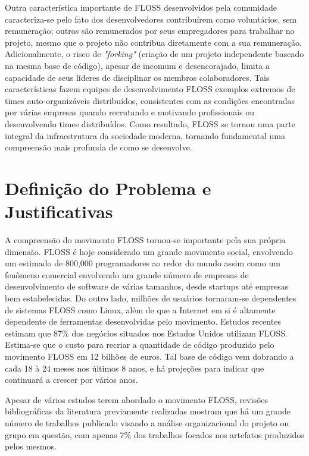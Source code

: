 Outra característica importante de FLOSS desenvolvidos pela comunidade caracteriza-se pelo fato dos desenvolvedores contribuírem como voluntários, sem remuneração; outros são remunerados por seus empregadores para trabalhar no projeto, mesmo que o projeto não contribua diretamente com a sua remuneração. Adicionalmente, o risco de \textit{"forking"} (criação de um projeto independente baseado na mesma base de código), apesar de incomum e desencorajado, limita a capacidade de seus líderes de disciplinar os membros colaboradores. Tais características fazem equipes de desenvolvimento FLOSS exemplos extremos de times auto-organizáveis distribuídos, consistentes com as condições encontradas por várias empresas quando recrutando e motivando profissionais ou desenvolvendo times distribuídos.
Como resultado, FLOSS se tornou uma parte integral da infraestrutura da sociedade moderna, tornando fundamental uma compreensão mais profunda de como se desenvolve.




\section{Definição do Problema e Justificativas}

A compreensão do movimento FLOSS tornou-se importante pela sua própria dimensão\cite{crowston2012free}. FLOSS é hoje considerado um grande movimento social, envolvendo um estimado de 800,000 programadores ao redor do mundo assim como um fenômeno comercial envolvendo um grande número de empresas de desenvolvimento de software de várias tamanhos, desde startups até empresas bem estabelecidas. Do outro lado, milhões  de usuários tornaram-se dependentes de sistemas FLOSS como Linux, além de que a Internet em si é altamente dependente de ferramentas desenvolvidas pelo movimento. Estudos recentes estimam que 87\% dos negócios situados nos Estados Unidos utilizam FLOSS. Estima-se que o custo para recriar a quantidade de código produzido pelo movimento FLOSS em 12 bilhões de euros. Tal base de código vem dobrando a cada 18 à 24 meses nos últimos 8 anos, e há projeções para indicar que continuará a crescer por vários anos\cite{ghosh2007economic}. 

Apesar de vários estudos terem abordado o movimento FLOSS, revisões bibliográficas da literatura previamente realizadas\cite{crowston2012free} mostram que 
há um grande número de trabalhos publicado visando a análise organizacional do projeto ou grupo em questão, com apenas 7\% dos trabalhos focados nos artefatos produzidos pelos mesmos. 

